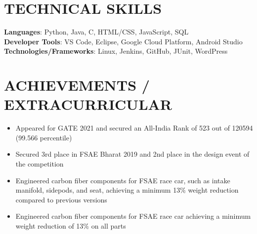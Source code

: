 \documentclass[letterpaper,10.5pt]{article}
\makeatletter
\newcommand{\resumeItem}[1]{
  \item\small{
    {#1 \vspace{-2pt}}
  }
}
\newcommand{\resumeSubheading}[4]{
  \vspace{-2pt}\item
    \begin{tabular*}{1.0\textwidth}[t]{l@{\extracolsep{\fill}}r}
      \textbf{#1} & \textbf{\small #2} \\
      \textit{\small#3} & \textit{\small #4} \\
    \end{tabular*}\vspace{-7pt}
}
\newcommand{\resumeSubHeadingListStart}{\begin{itemize}[leftmargin=0.0in, label={}]}
\newcommand{\resumeSubHeadingListEnd}{\end{itemize}}
\newcommand{\resumeItemListStart}{\begin{itemize}}
\newcommand{\resumeItemListEnd}{\end{itemize}\vspace{-5pt}}
\makeatother
\begin{document}
%
\section{TECHNICAL SKILLS}
 \begin{itemize}[leftmargin=0.15in, label={}]
    \small{\item{
     \textbf{Languages}{: Python, Java, C, HTML/CSS, JavaScript, SQL} \\
     \textbf{Developer Tools}{: VS Code, Eclipse, Google Cloud Platform, Android Studio} \\
     \textbf{Technologies/Frameworks}{: Linux, Jenkins, GitHub, JUnit, WordPress} \\
    }}
 \end{itemize}
 \vspace{-20pt}


\section{ACHIEVEMENTS / EXTRACURRICULAR}
    \resumeItemListStart
        \resumeItem{Appeared for GATE 2021 and secured an All-India Rank of 523 out of 120594 (99.566 percentile)}
        \vspace{-5pt}
        \resumeItem{Secured 3rd place in FSAE Bharat 2019 and 2nd place in the design event of the competition}
        \vspace{-5pt}
        \resumeItem{Engineered carbon fiber components for FSAE race car, such as intake manifold, sidepods, and seat, achieving a minimum 13\% weight reduction compared to previous versions}
        \vspace{-5pt}
        \resumeItem{Engineered carbon fiber components for FSAE race car achieving a minimum weight reduction of 13\% on all parts }
        \vspace{-5pt}
    \resumeItemListEnd
        

\end{document}
